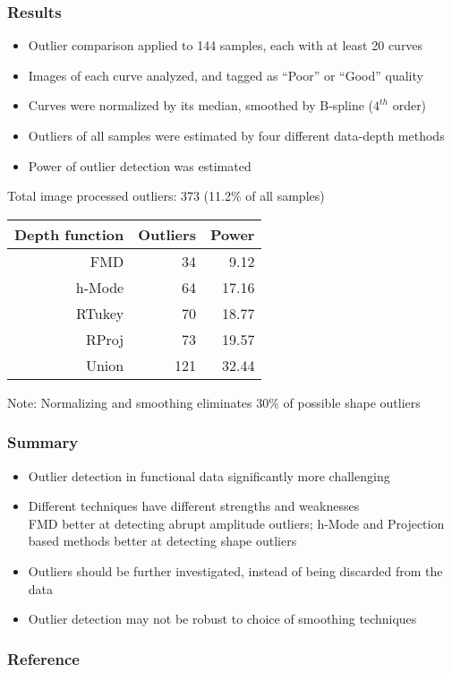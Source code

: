 \documentclass[10pt,dvipsnames,table]{beamer}
\begin{document}
\begin{frame}
\frametitle{Results}
\begin{itemize}
\item Outlier comparison applied to 144 samples, each with at least 20 curves
\item Images of each curve analyzed, and tagged as ``Poor'' or ``Good'' quality
\item Curves were normalized by its median, smoothed by B-spline ($4^{th}$ order)
\item Outliers of all samples were estimated by four different data-depth methods
\item Power of outlier detection was estimated
\end{itemize}
\pause
Total image processed outliers: 373 (11.2\% of all samples) \\
\begin{table}[ht]
\centering
\begin{tabular}{rrr}
  \hline
  \hline
  Depth function & Outliers & Power \\ 
  \hline
  FMD & 34 & 9.12 \\ 
  h-Mode & 64 & 17.16 \\ 
  RTukey & 70 & 18.77 \\ 
  RProj & 73 & 19.57 \\ 
  Union & 121 & 32.44 \\ 
  \hline
  \hline
\end{tabular}
\end{table}
Note: Normalizing and smoothing eliminates 30\% of possible shape outliers
\end{frame}

\begin{frame}
\frametitle{Summary}
\begin{itemize}
\item Outlier detection in functional data significantly more challenging
\item Different techniques have different strengths and weaknesses \\
\hspace{0.5cm} 
FMD better at detecting abrupt amplitude outliers; h-Mode and Projection based methods better at detecting shape outliers
\item Outliers should be further investigated, instead of being discarded from the data
\item Outlier detection may not be robust to choice of smoothing techniques
\end{itemize}

\end{frame}

\begin{frame}
\frametitle{Reference}
{\footnotesize{
    
    
}}
\end{frame}
\end{document}
